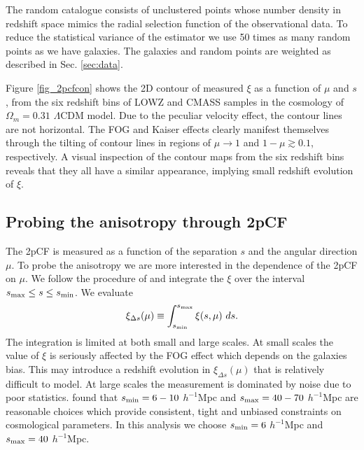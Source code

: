 \documentclass[iop]{emulateapj}
\begin{document}
The random catalogue consists of unclustered points whose number density in redshift space mimics the radial selection function of the observational data. 
To reduce the statistical variance of the estimator we use 50 times as many random points as we have galaxies.
The galaxies and random points are weighted as described in Sec. \ref{sec:data}.

Figure \ref{fig_2pcfcon} shows the 2D contour of measured $\xi$ as a function of $\mu$ and $s$,
from the six redshift bins of LOWZ and CMASS samples 
in the cosmology of $\Omega_m=0.31$ $\Lambda$CDM model.
Due to the peculiar velocity effect, the contour lines are not horizontal.
The FOG \citep{FOG} and Kaiser \citep{Kaiser1987} effects 
clearly manifest themselves through the tilting of contour lines in regions of $\mu \rightarrow 1$ and $1-\mu \gtrsim0.1$, respectively.
A visual inspection of the contour maps from the six redshift bins 
reveals that they all have a similar appearance,
implying small redshift evolution of $\xi$.

\subsection{Probing the anisotropy through 2pCF}

The 2pCF is measured as a function of the separation $s$ and the angular direction $\mu$.
To probe the anisotropy we are more interested in the dependence of the 2pCF on $\mu$.
We follow the procedure of \cite{Li2015} and integrate the $\xi$ over the interval $s_{\rm max} \leq s \leq s_{\rm min}$.
We evaluate
\begin{equation}\label{eq:xideltas}
\xi_{\Delta s} (\mu) \equiv \int_{s_{\rm min}}^{s_{\rm max}} \xi (s,\mu)\ ds.%
\end{equation}
The integration is limited at both small and large scales.
At small scales the value of $\xi$ is seriously affected by the FOG effect \citep{FOG}
which depends on the galaxies bias.
This may introduce a redshift evolution in $\xi_{\Delta s}(\mu)$ that is relatively difficult to model.
At large scales the measurement is dominated by noise due to poor statistics.
\cite{Li2015} found that $s_{\rm min}=6-10$ $h^{-1}$Mpc and $s_{\rm max}=40-70$ $h^{-1}$Mpc are reasonable choices 
which provide consistent, tight and unbiased constraints on cosmological parameters.
In this analysis we choose $s_{\rm min}=6$ $h^{-1}$Mpc and $s_{\rm max}=40$ $h^{-1}$Mpc.
\end{document}
